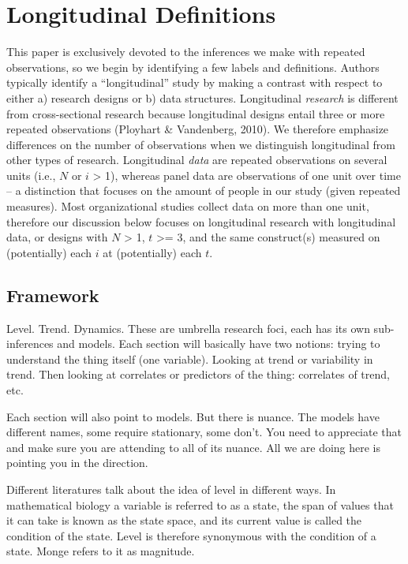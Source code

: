 \documentclass[english,,man]{apa6}
\theoremstyle{definition}
\theoremstyle{definition}
\theoremstyle{definition}
\theoremstyle{remark}
\begin{document}
\hypertarget{longitudinal-definitions}{%
\section{Longitudinal Definitions}\label{longitudinal-definitions}}

This paper is exclusively devoted to the inferences we make with
repeated observations, so we begin by identifying a few labels and
definitions. Authors typically identify a \enquote{longitudinal} study
by making a contrast with respect to either a) research designs or b)
data structures. Longitudinal \emph{research} is different from
cross-sectional research because longitudinal designs entail three or
more repeated observations (Ployhart \& Vandenberg, 2010). We therefore
emphasize differences on the number of observations when we distinguish
longitudinal from other types of research. Longitudinal \emph{data} are
repeated observations on several units (i.e., \(N\) or \(i\)
\textgreater{} 1), whereas panel data are observations of one unit over
time -- a distinction that focuses on the amount of people in our study
(given repeated measures). Most organizational studies collect data on
more than one unit, therefore our discussion below focuses on
longitudinal research with longitudinal data, or designs with \(N\)
\textgreater{} 1, \(t\) \textgreater{}= 3, and the same construct(s)
measured on (potentially) each \(i\) at (potentially) each \(t\).

\hypertarget{framework}{%
\subsection{Framework}\label{framework}}

Level. Trend. Dynamics. These are umbrella research foci, each has its
own sub-inferences and models. Each section will basically have two
notions: trying to understand the thing itself (one variable). Looking
at trend or variability in trend. Then looking at correlates or
predictors of the thing: correlates of trend, etc.

Each section will also point to models. But there is nuance. The models
have different names, some require stationary, some don't. You need to
appreciate that and make sure you are attending to all of its nuance.
All we are doing here is pointing you in the direction.

Different literatures talk about the idea of level in different ways. In
mathematical biology a variable is referred to as a state, the span of
values that it can take is known as the state space, and its current
value is called the condition of the state. Level is therefore
synonymous with the condition of a state. Monge refers to it as
magnitude.
\end{document}
